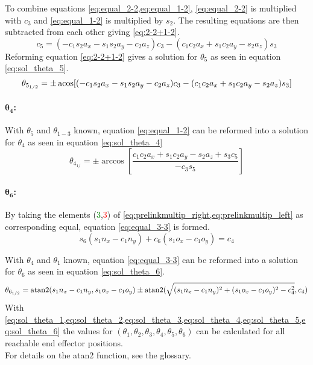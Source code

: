 To combine equations \cref{eq:equal_2-2,eq:equal_1-2}, \cref{eq:equal_2-2} is multiplied with $c_3$ and  \cref{eq:equal_1-2} is multiplied by $ s_2$. The resulting equations are then subtracted from each other giving \cref{eq:2-2+1-2}.
\begin{equation}\label{eq:2-2+1-2}
	c_5 = (-c_1 s_2 a_x - s_1 s_2 a_y -c_2 a_z) c_3 - (c_1 c_2 a_x +s_1 c_2 a_y - s_2 a_z) s_3
\end{equation}
Reforming equation \ref{eq:2-2+1-2} gives a solution for $\theta_5$ as seen in equation \ref{eq:sol_theta_5}.
\begin{equation}\label{eq:sol_theta_5}
	\theta_{5_{1/2}} = \pm \operatorname{acos} [ ( -c_1 s_2 a_x - s_1 s_2 a_y - c_2 a_z) c_3 - (c_1 c_2 a_x + s_1 c_2 a_y - s_2 a_z) s_3]
\end{equation}

\paragraph{$\pmb{\theta_4}$:}

With $\theta_5$ and $\theta_{1-3}$ known, equation \ref{eq:equal_1-2} can be reformed into a solution for $\theta_4$ as seen in equation \ref{eq:sol_theta_4}
\begin{equation}\label{eq:sol_theta_4}
	\theta_{4_{1/}} = \pm \arccos [ \frac{ c_1 c_2 a_x + s_1 c_2 a_y - s_2 a_z + s_3 c_5}{-c_3 s_5}]
\end{equation}

\paragraph{$\pmb{\theta_6}$:}
By taking the elements (\textcolor{green}{3},\textcolor{red}{3}) of \cref{eq:prelinkmultip_right,eq:prelinkmultip_left} as corresponding equal, equation \ref{eq:equal_3-3} is formed.
\begin{equation} \label{eq:equal_3-3}
	s_6 (s_1 n_x - c_1 n_y) + c_6 (s_1 o_x - c_1 o_y ) = c_4
\end{equation}

With $\theta_4$ and $\theta_1$ known, equation \ref{eq:equal_3-3} can be reformed into a solution for $\theta_6$ as seen in equation \ref{eq:sol_theta_6}.
\begin{equation}\label{eq:sol_theta_6}
	\theta_{6_{1/2}} = \operatorname{atan2}(s_1 n_x -c_1 n_y , s_1 o_x -c_1 o_y) \pm \operatorname{atan2}(\sqrt{(s_1 n_x - c_1 n_y)^2 + (s_1 o_x - c_1 o_y )^2 - c_4^2} , c_4)
\end{equation}
\medskip
With \cref{eq:sol_theta_1,eq:sol_theta_2,eq:sol_theta_3,eq:sol_theta_4,eq:sol_theta_5,eq:sol_theta_6} the values for $(\theta_1, \theta_2, \theta_3, \theta_4, \theta_5, \theta_6)$ can be calculated for all reachable end effector positions.\\
\medskip
For details on the \gls{atan2} function, see the glossary.
\medskip


